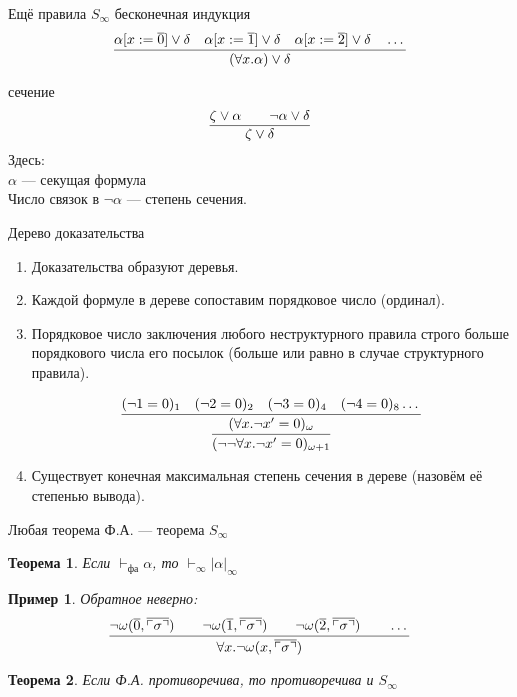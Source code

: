\documentclass[handout]{beamer}
\newtheorem{thm}{Теорема}[section]
\newtheorem{exm}{Пример}[section]
\begin{document}
\begin{frame}{Ещё правила $S_\infty$}
бесконечная индукция
$$\infer{(\forall x.\alpha)\vee\delta}{\alpha[x:=\overline{0}]\vee\delta
                                  \quad\alpha[x:=\overline{1}]\vee\delta
                                  \quad\alpha[x:=\overline{2}]\vee\delta\quad\dots}$$

сечение
$$\infer{\zeta\vee\delta}{\zeta\vee\alpha\quad\quad\neg\alpha\vee\delta}$$
Здесь: \\
$\alpha$ --- секущая формула \\
Число связок в $\neg\alpha$ --- степень сечения.
\end{frame}

\begin{frame}{Дерево доказательства}
\begin{enumerate}
\item Доказательства образуют деревья.
\item Каждой формуле в дереве сопоставим порядковое число (ординал).
\item Порядковое число заключения любого неструктурного правила строго больше порядкового числа его посылок
(больше или равно в случае структурного правила).


$$\infer{(\neg\neg\forall x.\neg x'=0)_{\omega+1}}{\infer{(\forall x.\neg x' = 0)_\omega}{(\neg 1=0)_1\quad (\neg 2=0)_2 \quad (\neg 3=0)_4 \quad (\neg 4 = 0)_8 \dots}}$$

\item Существует конечная максимальная степень сечения в дереве (назовём её степенью вывода).
\end{enumerate}
\end{frame}

\begin{frame}{Любая теорема Ф.А. --- теорема $S_\infty$}
\begin{thm}Если $\vdash_\text{фа}\alpha$, то $\vdash_\infty|\alpha|_\infty$ \end{thm}
\begin{exm}Обратное неверно: $$\infer{\forall x.\neg\omega(x,\overline{\ulcorner\sigma\urcorner})}
{\neg\omega(\overline{0},\overline{\ulcorner\sigma\urcorner})\quad\quad
 \neg\omega(\overline{1},\overline{\ulcorner\sigma\urcorner})\quad\quad
 \neg\omega(\overline{2},\overline{\ulcorner\sigma\urcorner})\quad\quad\dots}$$
\end{exm}
\begin{thm}Если Ф.А. противоречива, то противоречива и $S_\infty$\end{thm}
\end{frame}
\end{document}
